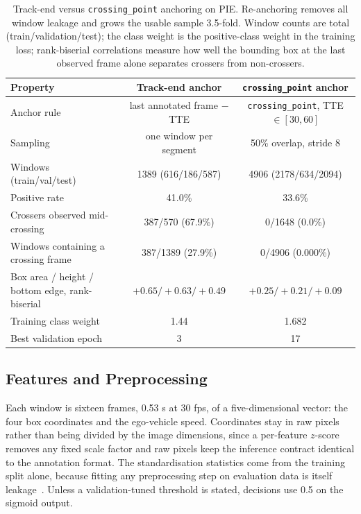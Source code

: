 \documentclass[mti,article,submit,moreauthors]{Definitions/mdpi}
\begin{document}
\begin{table}[htbp]
\caption{Track-end versus \texttt{crossing\_point} anchoring on PIE. Re-anchoring removes all window leakage and grows the usable sample 3.5-fold. Window counts are total (train/validation/test); the class weight is the positive-class weight in the training loss; rank-biserial correlations measure how well the bounding box at the last observed frame alone separates crossers from non-crossers.\label{tab:protocol}}
\begin{tabularx}{\textwidth}{lCC}
\toprule
\textbf{Property} & \textbf{Track-end anchor} & \textbf{\texttt{crossing\_point} anchor}\\
\midrule
Anchor rule & last annotated frame $-$ TTE & \texttt{crossing\_point}, TTE $\in [30,60]$\\
Sampling & one window per segment & 50\% overlap, stride 8\\
Windows (train/val/test) & 1389 (616/186/587) & 4906 (2178/634/2094)\\
Positive rate & 41.0\% & 33.6\%\\
Crossers observed mid-crossing & 387/570 (67.9\%) & 0/1648 (0.0\%)\\
Windows containing a crossing frame & 387/1389 (27.9\%) & 0/4906 (0.000\%)\\
Box area / height / bottom edge, rank-biserial & $+0.65 / +0.63 / +0.49$ & $+0.25 / +0.21 / +0.09$\\
Training class weight & 1.44 & 1.682\\
Best validation epoch & 3 & 17\\
\bottomrule
\end{tabularx}
\end{table}

\subsection{Features and Preprocessing}

Each window is sixteen frames, 0.53 s at 30 fps, of a five-dimensional vector: the four box coordinates and the ego-vehicle speed. Coordinates stay in raw pixels rather than being divided by the image dimensions, since a per-feature $z$-score removes any fixed scale factor and raw pixels keep the inference contract identical to the annotation format. The standardisation statistics come from the training split alone, because fitting any preprocessing step on evaluation data is itself leakage~\citep{kaufman2012leakage}. Unless a validation-tuned threshold is stated, decisions use 0.5 on the sigmoid output.
\end{document}
